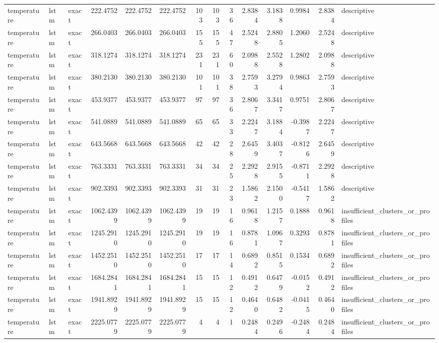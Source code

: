 \begin{tabular}{lllrrrrrrrrrrl}
temperature & lstm & exact & 222.4752 & 222.4752 & 222.4752 & 103 & 103 & 36 & 2.8384 & 3.1838 & 0.9984 & 2.8384 & descriptive \\
temperature & lstm & exact & 266.0403 & 266.0403 & 266.0403 & 155 & 155 & 47 & 2.5248 & 2.8805 & 1.2060 & 2.5248 & descriptive \\
temperature & lstm & exact & 318.1274 & 318.1274 & 318.1274 & 231 & 231 & 60 & 2.0988 & 2.5528 & 1.2802 & 2.0988 & descriptive \\
temperature & lstm & exact & 380.2130 & 380.2130 & 380.2130 & 101 & 101 & 38 & 2.7593 & 3.2794 & 0.9863 & 2.7593 & descriptive \\
temperature & lstm & exact & 453.9377 & 453.9377 & 453.9377 & 97 & 97 & 36 & 2.8067 & 3.3417 & 0.9751 & 2.8067 & descriptive \\
temperature & lstm & exact & 541.0889 & 541.0889 & 541.0889 & 65 & 65 & 33 & 2.2247 & 3.1884 & -0.3987 & 2.2247 & descriptive \\
temperature & lstm & exact & 643.5668 & 643.5668 & 643.5668 & 42 & 42 & 28 & 2.6459 & 3.4037 & -0.8126 & 2.6459 & descriptive \\
temperature & lstm & exact & 763.3331 & 763.3331 & 763.3331 & 34 & 34 & 25 & 2.2928 & 2.9155 & -0.8711 & 2.2928 & descriptive \\
temperature & lstm & exact & 902.3393 & 902.3393 & 902.3393 & 31 & 31 & 23 & 1.5862 & 2.1500 & -0.5417 & 1.5862 & descriptive \\
temperature & lstm & exact & 1062.4399 & 1062.4399 & 1062.4399 & 19 & 19 & 16 & 0.9618 & 1.2157 & 0.1888 & 0.9618 & insufficient_clusters_or_profiles \\
temperature & lstm & exact & 1245.2910 & 1245.2910 & 1245.2910 & 19 & 19 & 16 & 0.8781 & 1.0967 & 0.3293 & 0.8781 & insufficient_clusters_or_profiles \\
temperature & lstm & exact & 1452.2510 & 1452.2510 & 1452.2510 & 17 & 17 & 14 & 0.6892 & 0.8515 & 0.1534 & 0.6892 & insufficient_clusters_or_profiles \\
temperature & lstm & exact & 1684.2841 & 1684.2841 & 1684.2841 & 15 & 15 & 12 & 0.4912 & 0.6479 & -0.0152 & 0.4912 & insufficient_clusters_or_profiles \\
temperature & lstm & exact & 1941.8929 & 1941.8929 & 1941.8929 & 15 & 15 & 12 & 0.4640 & 0.6482 & -0.0415 & 0.4640 & insufficient_clusters_or_profiles \\
temperature & lstm & exact & 2225.0779 & 2225.0779 & 2225.0779 & 4 & 4 & 1 & 0.2484 & 0.2496 & -0.2484 & 0.2484 & insufficient_clusters_or_profiles \\

\end{tabular}

